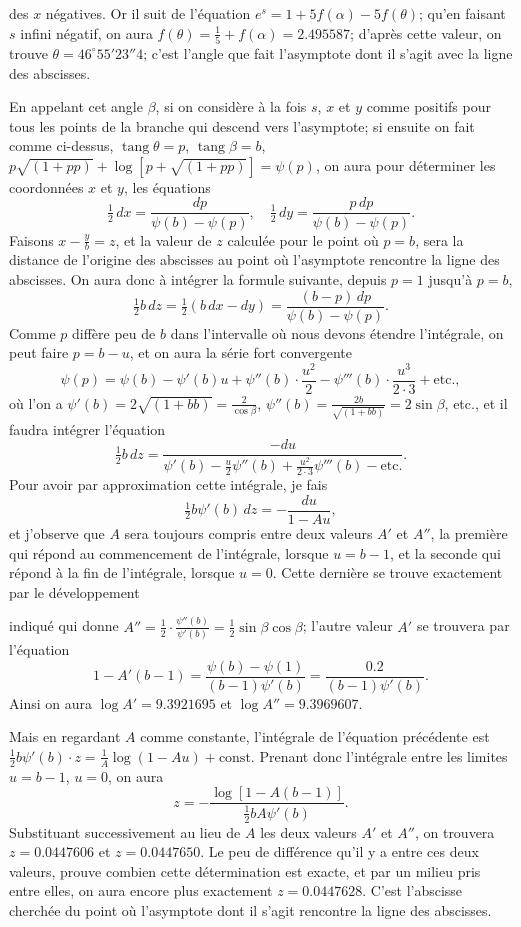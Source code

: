\documentclass{article}
\begin{document}
des $x$ négatives. Or il suit de l'équation $e^{s}=1+5f(\alpha)-5f(\theta)$; qu'en faisant $s$ infini négatif, on aura $f(\theta)=\frac{1}{5}+f(\alpha)=2.495587$; d'après cette valeur, on trouve $\theta=46^{\circ}55'23''4$; c'est l'angle que fait l'asymptote dont il s'agit avec la ligne des abscisses.

En appelant cet angle $\beta$, si on considère à la fois $s$, $x$ et $y$ comme positifs pour tous les points de la branche qui descend vers l'asymptote; si ensuite on fait comme ci-dessus, $\operatorname{tang}\theta=p$, $\operatorname{tang}\beta=b$, $p\sqrt{(1+pp)}+\log[p+\sqrt{(1+pp)}]=\psi(p)$, on aura pour déterminer les coordonnées $x$ et $y$, les équations
\[ \tfrac{1}{2}\,dx=\frac{dp}{\psi(b)-\psi(p)},\quad \tfrac{1}{2}\,dy=\frac{p\,dp}{\psi(b)-\psi(p)}. \]
Faisons $x-\frac{y}{b}=z$, et la valeur de $z$ calculée pour le point où $p=b$, sera la distance de l'origine des abscisses au point où l'asymptote rencontre la ligne des abscisses. On aura donc à intégrer la formule suivante, depuis $p=1$ jusqu'à $p=b$,
\[ \tfrac{1}{2}b\,dz=\tfrac{1}{2}(b\,dx-dy)=\frac{(b-p)\,dp}{\psi(b)-\psi(p)}. \]
Comme $p$ diffère peu de $b$ dans l'intervalle où nous devons étendre l'intégrale, on peut faire $p=b-u$, et on aura la série fort convergente
\[ \psi(p)=\psi(b)-\psi'(b)u+\psi''(b)\cdot\frac{u^{2}}{2}-\psi'''(b)\cdot\frac{u^{3}}{2\cdot3}+\text{etc.}, \]
où l'on a $\psi'(b)=2\sqrt{(1+bb)}=\frac{2}{\cos\beta}$, $\psi''(b)=\frac{2b}{\sqrt{(1+bb)}}=2\sin\beta$, etc., et il faudra intégrer l'équation
\[ \tfrac{1}{2}b\,dz=\frac{-du}{\psi'(b)-\frac{u}{2}\psi''(b)+\frac{u^{2}}{2\cdot3}\psi'''(b)-\text{etc.}}. \]
Pour avoir par approximation cette intégrale, je fais
\[ \tfrac{1}{2}b\psi'(b)\,dz=-\frac{du}{1-Au}, \]
et j'observe que $A$ sera toujours compris entre deux valeurs $A'$ et $A''$, la première qui répond au commencement de l'intégrale, lorsque $u=b-1$, et la seconde qui répond à la fin de l'intégrale, lorsque $u=0$. Cette dernière se trouve exactement par le développement

indiqué qui donne $A''=\frac{1}{2}\cdot\frac{\psi''(b)}{\psi'(b)}=\frac{1}{2}\sin\beta\cos\beta$; l'autre valeur $A'$ se trouvera par l'équation
\[ 1-A'(b-1)=\frac{\psi(b)-\psi(1)}{(b-1)\psi'(b)}=\frac{0.2}{(b-1)\psi'(b)}. \]
Ainsi on aura $\log A'=9.3921695$ et $\log A''=9.3969607$.

Mais en regardant $A$ comme constante, l'intégrale de l'équation précédente est $\frac{1}{2}b\psi'(b)\cdot z=\frac{1}{A}\log(1-Au)+\text{const.}$ Prenant donc l'intégrale entre les limites $u=b-1$, $u=0$, on aura
\[ z=-\frac{\log[1-A(b-1)]}{\frac{1}{2}bA\psi'(b)}. \]
Substituant successivement au lieu de $A$ les deux valeurs $A'$ et $A''$, on trouvera $z=0.0447606$ et $z=0.0447650$. Le peu de différence qu'il y a entre ces deux valeurs, prouve combien cette détermination est exacte, et par un milieu pris entre elles, on aura encore plus exactement $z=0.0447628$. C'est l'abscisse cherchée du point où l'asymptote dont il s'agit rencontre la ligne des abscisses.
\end{document}
